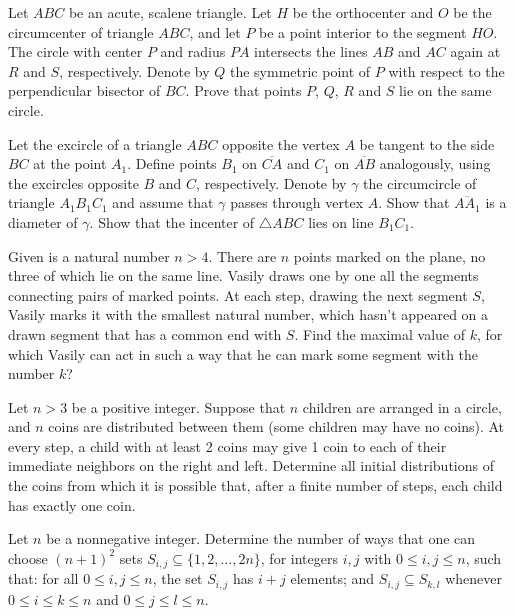 \documentclass[11pt]{scrartcl}
\begin{document}
\begin{problem}[156471770451237]
	Let $ABC$ be an acute, scalene triangle. Let $H$ be the orthocenter and $O$ be the circumcenter of triangle $ABC$, and let $P$ be a point interior to the segment $HO.$ The circle with center $P$ and radius $PA$ intersects the lines $AB$ and $AC$ again at $R$ and $S$, respectively. Denote by $Q$ the symmetric point of $P$ with respect to the perpendicular bisector of $BC$. Prove that points $P$, $Q$, $R$ and $S$ lie on the same circle.
\end{problem}
\begin{problem}[495587557940069]
Let the excircle of a triangle $ABC$ opposite the vertex $A$ be tangent to the side $BC$ at the point $A_1$. Define points $B_1$ on $\overline{CA}$ and $C_1$ on $\overline{AB}$ analogously, using the excircles opposite $B$ and $C$, respectively. Denote by $\gamma$ the circumcircle of triangle $A_1B_1C_1$ and assume that $\gamma$ passes through vertex $A$.
Show that $\overline{AA_1}$ is a diameter of $\gamma$.
Show that the incenter of $\triangle ABC$ lies on line $B_1C_1$.
\end{problem}
\begin{problem}[4218160072471349910]
Given is a natural number $n>4$. There are $n$ points marked on the plane, no three of which lie on the same line. Vasily draws one by one all the segments connecting pairs of marked points. At each step, drawing the next segment $S$, Vasily marks it with the smallest natural number, which hasn't appeared on a drawn segment that has a common end with $S$. Find the maximal value of $k$, for which Vasily can act in such a way that he can mark some segment with the number $k$?
\end{problem}
\begin{problem}[931951248564234]
Let $n > 3$ be a positive integer. Suppose that $n$ children are arranged in a circle, and $n$ coins are distributed between them (some children may have no coins). At every step, a child with at least 2 coins may give 1 coin to each of their immediate neighbors on the right and left. Determine all initial distributions of the coins from which it is possible that, after a finite number of steps, each child has exactly one coin.
\end{problem}
\begin{problem}[141955509989127]
Let $n$ be a nonnegative integer. Determine the number of ways that one can choose $(n+1)^2$ sets $S_{i,j}\subseteq\{1,2,\ldots,2n\}$, for integers $i,j$ with $0\leq i,j\leq n$, such that:
for all $0\leq i,j\leq n$, the set $S_{i,j}$ has $i+j$ elements; and
$S_{i,j}\subseteq S_{k,l}$ whenever $0\leq i\leq k\leq n$ and $0\leq j\leq l\leq n$.
\end{problem}
\end{document}

